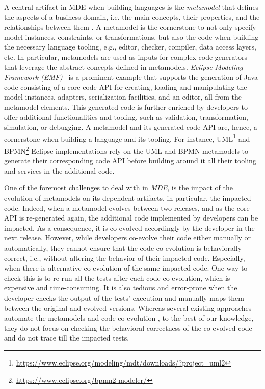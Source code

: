 A central artifact in MDE when building languages is the \emph{metamodel} that defines the aspects of a business domain, i.e. the main concepts, their properties, and the relationships between them \cite{cabot2012object}. A metamodel is the cornerstone to not only specify model instances, constraints, or transformations, but also the code when building the necessary language tooling, e.g., editor, checker, compiler, data access layers, etc. 
In particular, metamodels are used as inputs for complex code generators that leverage the abstract concepts defined in metamodels.
\emph{Eclipse Modeling Framework (EMF)}~\cite{steinberg2008emf} is a prominent example that supports the generation of Java code consisting of a core code API for creating, loading and manipulating the model instances, adapters, serialization facilities, and an editor, all from the metamodel elements.
This generated code is further enriched by developers to offer additional functionalities and tooling, such as validation, transformation, simulation, or debugging. A metamodel and its generated code API are, hence, a cornerstone when building a language and its tooling.
For instance, UML\footnote{\url{https://www.eclipse.org/modeling/mdt/downloads/?project=uml2}}  and BPMN\footnote{\url{https://www.eclipse.org/bpmn2-modeler/}} Eclipse implementations rely on the UML and BPMN metamodels to generate their corresponding code API before building around it all their tooling and services in the additional code. %

One of the foremost challenges to deal with in \emph{MDE}, is the impact of the evolution of metamodels on its dependent artifacts, in particular, the impacted code.
Indeed, when a metamodel evolves between two releases, and as the core API is re-generated again, the additional code implemented by developers can be impacted. As a consequence, it is co-evolved accordingly by the developer in the next release. 
%
However, while developers co-evolve their code either manually or automatically, they cannot ensure that the code co-evolution is behaviorally correct, i.e., without altering the behavior of their impacted code. Especially, when there is alternative co-evolution of the same impacted code. 
One way to check this is to re-run all the tests after each code co-evolution, which is expensive and time-consuming. It is also tedious and error-prone when the developer checks the output of the tests' execution and manually maps them between the original and evolved versions. 
Whereas several existing approaches automate the metamodels and code co-evolution \cite{riedl2014towards,pham2017bidirectional,jongeling2020towards,jongeling2022Structural,zaheri2021towards,yu2012maintaining,Khelladi2020}, to the best of our knowledge, they do not focus on checking the behavioral correctness of the co-evolved code and do not trace till the impacted tests. 

